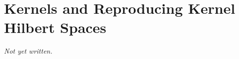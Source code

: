 \chapter{Kernels and Reproducing Kernel Hilbert Spaces}\label{ch:kernels-rkhs}


\textit{Not yet written.}
